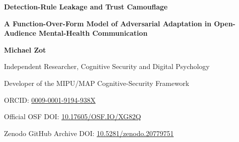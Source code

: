 \documentclass[11pt, letterpaper]{article}
\begin{document}
\begin{center}
    \vspace*{-1.20cm}
    {\LARGE\bfseries\color{primary} Detection-Rule Leakage and Trust Camouflage\par}
    \vspace{0.25em}
    {\large\bfseries A Function-Over-Form Model of Adversarial Adaptation in Open-Audience Mental-Health Communication\par}
    \vspace{0.65em}
    {\normalsize \textbf{Michael Zot}\par}
    {\normalsize Independent Researcher, Cognitive Security and Digital Psychology\par}
    {\normalsize Developer of the MIPU/MAP Cognitive-Security Framework\par}
    {\normalsize ORCID: \href{https://orcid.org/0009-0001-9194-938X}{0009-0001-9194-938X}\par}
    {\normalsize Official OSF DOI: \href{https://doi.org/10.17605/OSF.IO/XG82Q}{10.17605/OSF.IO/XG82Q}\par}
    {\normalsize Zenodo GitHub Archive DOI: \href{https://doi.org/10.5281/zenodo.20779751}{10.5281/zenodo.20779751}\par}
\end{center}

\vspace{0.05cm}
\end{document}
